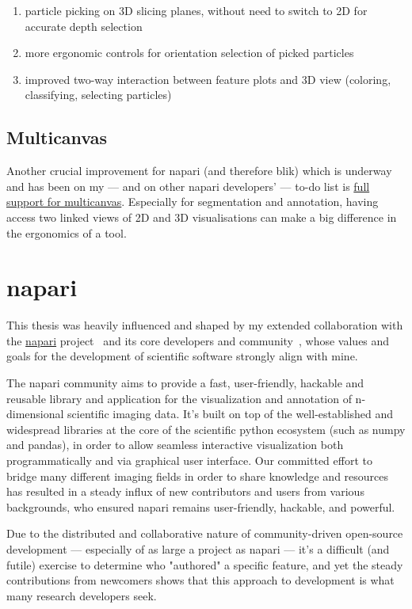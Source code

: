\begin{enumerate}[noitemsep]
    \item particle picking on 3D slicing planes, without need to switch to 2D for accurate depth selection
    \item more ergonomic controls for orientation selection of picked particles
    \item improved two-way interaction between feature plots and 3D view (coloring, classifying, selecting particles)
\end{enumerate}

\subsection{Multicanvas}
Another crucial improvement for napari (and therefore blik) which is underway and has been on my --- and on other napari developers' --- to-do list is \href{https://github.com/napari/napari/issues/5348}{full support for multicanvas}.
Especially for segmentation and annotation, having access two linked views of 2D and 3D visualisations can make a big difference in the ergonomics of a tool.


\section{napari}

This thesis was heavily influenced and shaped by my extended collaboration with the \href{https://napari.org/}{napari} project~\cite{thenaparicommunityNapariMultidimensionalImage2024} and its core developers and community~\cite{thenaparicommunityCommunityNapari2024}, whose values and goals for the development of scientific software strongly align with mine.

The napari community aims to provide a fast, user-friendly, hackable and reusable library and application for the visualization and annotation of n-dimen\-sional scientific imaging data.
It's built on top of the well-established and wide\-spread libraries at the core of the scientific python ecosystem (such as numpy and pandas), in order to allow seamless interactive visualization both programmatically and via graphical user interface.
Our committed effort to bridge many different imaging fields in order to share knowledge and resources has resulted in a steady influx of new contributors and users from various backgrounds, who ensured napari remains user-friendly, hackable, and powerful.

Due to the distributed and collaborative nature of community-driven open-source development --- especially of as large a project as napari --- it's a difficult (and futile) exercise to determine who "authored" a specific feature, and yet the steady contributions from newcomers shows that this approach to development is what many research developers seek.

